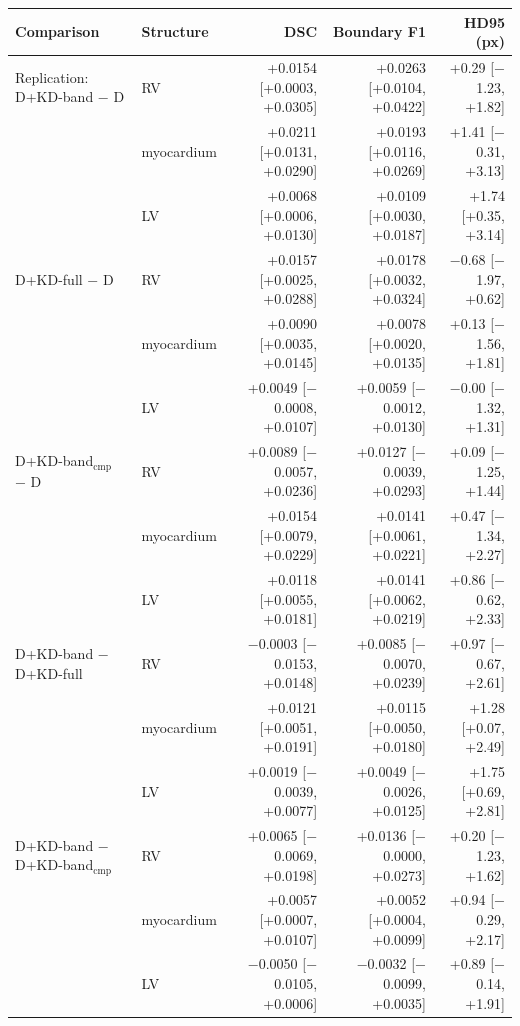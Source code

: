 \begin{tabular}{@{}llrrr@{}}
\toprule
Comparison & Structure & DSC & Boundary F1 & HD95 (px) \\
\midrule
Replication: D+KD-band $-$ D & RV & +0.0154 [+0.0003, +0.0305] & +0.0263 [+0.0104, +0.0422] & +0.29 [$-$1.23, +1.82] \\
 & myocardium & +0.0211 [+0.0131, +0.0290] & +0.0193 [+0.0116, +0.0269] & +1.41 [$-$0.31, +3.13] \\
 & LV & +0.0068 [+0.0006, +0.0130] & +0.0109 [+0.0030, +0.0187] & +1.74 [+0.35, +3.14] \\
\midrule
D+KD-full $-$ D & RV & +0.0157 [+0.0025, +0.0288] & +0.0178 [+0.0032, +0.0324] & $-$0.68 [$-$1.97, +0.62] \\
 & myocardium & +0.0090 [+0.0035, +0.0145] & +0.0078 [+0.0020, +0.0135] & +0.13 [$-$1.56, +1.81] \\
 & LV & +0.0049 [$-$0.0008, +0.0107] & +0.0059 [$-$0.0012, +0.0130] & $-$0.00 [$-$1.32, +1.31] \\
\midrule
D+KD-band$_{\mathrm{cmp}}$ $-$ D & RV & +0.0089 [$-$0.0057, +0.0236] & +0.0127 [$-$0.0039, +0.0293] & +0.09 [$-$1.25, +1.44] \\
 & myocardium & +0.0154 [+0.0079, +0.0229] & +0.0141 [+0.0061, +0.0221] & +0.47 [$-$1.34, +2.27] \\
 & LV & +0.0118 [+0.0055, +0.0181] & +0.0141 [+0.0062, +0.0219] & +0.86 [$-$0.62, +2.33] \\
\midrule
D+KD-band $-$ D+KD-full & RV & $-$0.0003 [$-$0.0153, +0.0148] & +0.0085 [$-$0.0070, +0.0239] & +0.97 [$-$0.67, +2.61] \\
 & myocardium & +0.0121 [+0.0051, +0.0191] & +0.0115 [+0.0050, +0.0180] & +1.28 [+0.07, +2.49] \\
 & LV & +0.0019 [$-$0.0039, +0.0077] & +0.0049 [$-$0.0026, +0.0125] & +1.75 [+0.69, +2.81] \\
\midrule
D+KD-band $-$ D+KD-band$_{\mathrm{cmp}}$ & RV & +0.0065 [$-$0.0069, +0.0198] & +0.0136 [$-$0.0000, +0.0273] & +0.20 [$-$1.23, +1.62] \\
 & myocardium & +0.0057 [+0.0007, +0.0107] & +0.0052 [+0.0004, +0.0099] & +0.94 [$-$0.29, +2.17] \\
 & LV & $-$0.0050 [$-$0.0105, +0.0006] & $-$0.0032 [$-$0.0099, +0.0035] & +0.89 [$-$0.14, +1.91] \\
\bottomrule
\end{tabular}

